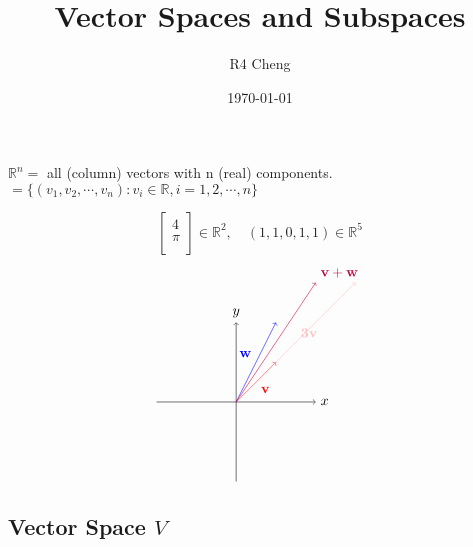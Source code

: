 \documentclass[12pt,a4paper]{article}
\title{Vector Spaces and Subspaces}
\author{R4 Cheng}
\date{\today}
\begin{document}
\maketitle

$\mathbb{R}^n = $ all (column) vectors with n (real) components. \\
$= \{ (v_1, v_2, \cdots, v_n): v_i \in \mathbb{R}, i = 1, 2, \cdots, n \}$

\[
\begin{bmatrix}
  4 \\
  \pi \\
\end{bmatrix} \in \mathbb{R}^2,
\quad
(1, 1, 0, 1, 1) \in \mathbb{R}^5
\]
\[
\begin{tikzpicture}
  \draw[->] (-2, 0) -- (2, 0) node[right] {$x$};
  \draw[->] (0, -2) -- (0, 2) node[above] {$y$};
  
  \draw[->, red] (0, 0) -- (1, 1) node[midway, below right] {$\mathbf{v}$};
  \draw[->, pink] (0, 0) -- (3, 3) node[midway, above right] {$\mathbf{3v}$};
  
  \draw[->, blue] (0, 0) -- (1, 2) node[midway, above left] {$\mathbf{w}$};
  
  \draw[->, purple] (0, 0) -- (2, 3) node[above right] {$\mathbf{v} + \mathbf{w}$};
\end{tikzpicture}
\]

\subsection*{Vector Space $V$}
\end{document}

